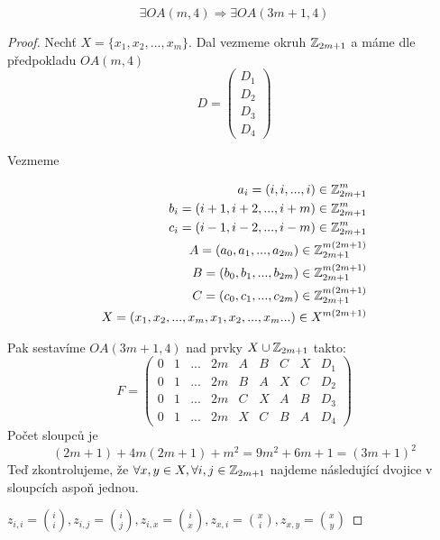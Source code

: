 
\begin{lemma}
	\[ \exists OA(m, 4) \Rightarrow \exists OA(3m + 1, 4) \]
\end{lemma}
\begin{proof}
	Nechť $X = \{ x_1, x_2, ..., x_m \}$.
	Dal vezmeme okruh $\operatorname{\mathbb{Z}}_{2m + 1}$ a máme dle předpokladu $OA(m, 4)$
	\[ D =
	\begin{pmatrix}
	D_1\\
	D_2\\
	D_3\\
	D_4
	\end{pmatrix}
	\]

	Vezmeme

	\begin{equation*}
	\begin{aligned}
		a_i = (i, i, ..., i) \in \operatorname{\mathbb{Z}}_{2m + 1}^m\\
		b_i = (i + 1, i + 2, ..., i + m) \in \operatorname{\mathbb{Z}}_{2m + 1}^m\\
		c_i = (i - 1, i - 2, ..., i - m) \in \operatorname{\mathbb{Z}}_{2m + 1}^m\\
		A = (a_0, a_1, ..., a_{2m}) \in \operatorname{\mathbb{Z}}_{2m + 1}^{m(2m + 1)}\\
		B = (b_0, b_1, ..., b_{2m}) \in \operatorname{\mathbb{Z}}_{2m + 1}^{m(2m + 1)}\\
		C = (c_0, c_1, ..., c_{2m}) \in \operatorname{\mathbb{Z}}_{2m + 1}^{m(2m + 1)}\\
		X = (x_1, x_2, ..., x_m, x_1, x_2, ..., x_m ...) \in X^{m(2m + 1)}\\
	\end{aligned}
	\end{equation*}

	Pak sestavíme $OA(3m + 1, 4)$ nad prvky $X \cup \operatorname{\mathbb{Z}}_{2m + 1}$ takto:
	\[ F =
	\begin{pmatrix}
		0 & 1 & ... & 2m & A & B & C & X & D_1\\
		0 & 1 & ... & 2m & B & A & X & C & D_2\\
		0 & 1 & ... & 2m & C & X & A & B & D_3\\
		0 & 1 & ... & 2m & X & C & B & A & D_4
	\end{pmatrix}
	\]
	Počet sloupců je
	\[ (2m+1) + 4m(2m + 1) + m^2 = 9m^2 + 6m + 1 = (3m + 1)^2 \]
	Teď zkontrolujeme, že $\forall x,y \in X, \forall i,j \in \operatorname{\mathbb{Z}}_{2m + 1}$ najdeme následující dvojice v sloupcích aspoň jednou.

	$z_{i, i} = \binom{i}{i}, z_{i, j} = \binom{i}{j}, z_{i, x} = \binom{i}{x}, z_{x, i} = \binom{x}{i}, z_{x, y} = \binom{x}{y}$


\end{proof}
